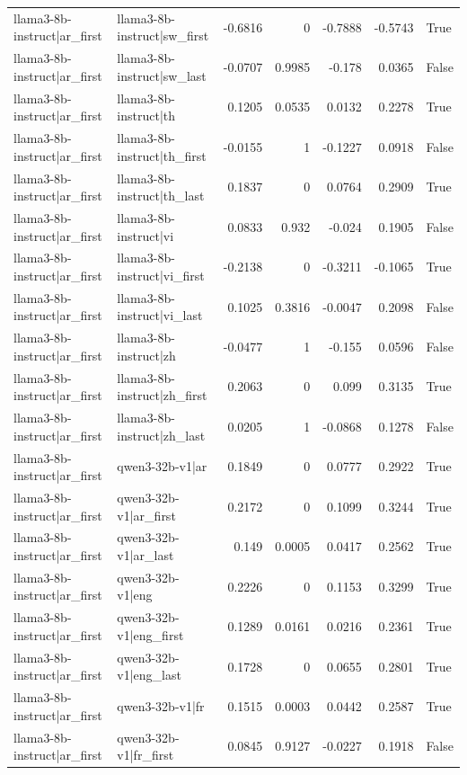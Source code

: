 \begin{table}
\begin{tabular}{l l r r r r l}
llama3-8b-instruct|ar_first & llama3-8b-instruct|sw_first & -0.6816 & 0 & -0.7888 & -0.5743 & True \\
llama3-8b-instruct|ar_first & llama3-8b-instruct|sw_last & -0.0707 & 0.9985 & -0.178 & 0.0365 & False \\
llama3-8b-instruct|ar_first & llama3-8b-instruct|th & 0.1205 & 0.0535 & 0.0132 & 0.2278 & True \\
llama3-8b-instruct|ar_first & llama3-8b-instruct|th_first & -0.0155 & 1 & -0.1227 & 0.0918 & False \\
llama3-8b-instruct|ar_first & llama3-8b-instruct|th_last & 0.1837 & 0 & 0.0764 & 0.2909 & True \\
llama3-8b-instruct|ar_first & llama3-8b-instruct|vi & 0.0833 & 0.932 & -0.024 & 0.1905 & False \\
llama3-8b-instruct|ar_first & llama3-8b-instruct|vi_first & -0.2138 & 0 & -0.3211 & -0.1065 & True \\
llama3-8b-instruct|ar_first & llama3-8b-instruct|vi_last & 0.1025 & 0.3816 & -0.0047 & 0.2098 & False \\
llama3-8b-instruct|ar_first & llama3-8b-instruct|zh & -0.0477 & 1 & -0.155 & 0.0596 & False \\
llama3-8b-instruct|ar_first & llama3-8b-instruct|zh_first & 0.2063 & 0 & 0.099 & 0.3135 & True \\
llama3-8b-instruct|ar_first & llama3-8b-instruct|zh_last & 0.0205 & 1 & -0.0868 & 0.1278 & False \\
llama3-8b-instruct|ar_first & qwen3-32b-v1|ar & 0.1849 & 0 & 0.0777 & 0.2922 & True \\
llama3-8b-instruct|ar_first & qwen3-32b-v1|ar_first & 0.2172 & 0 & 0.1099 & 0.3244 & True \\
llama3-8b-instruct|ar_first & qwen3-32b-v1|ar_last & 0.149 & 0.0005 & 0.0417 & 0.2562 & True \\
llama3-8b-instruct|ar_first & qwen3-32b-v1|eng & 0.2226 & 0 & 0.1153 & 0.3299 & True \\
llama3-8b-instruct|ar_first & qwen3-32b-v1|eng_first & 0.1289 & 0.0161 & 0.0216 & 0.2361 & True \\
llama3-8b-instruct|ar_first & qwen3-32b-v1|eng_last & 0.1728 & 0 & 0.0655 & 0.2801 & True \\
llama3-8b-instruct|ar_first & qwen3-32b-v1|fr & 0.1515 & 0.0003 & 0.0442 & 0.2587 & True \\
llama3-8b-instruct|ar_first & qwen3-32b-v1|fr_first & 0.0845 & 0.9127 & -0.0227 & 0.1918 & False \\

\end{tabular}
\end{table}
